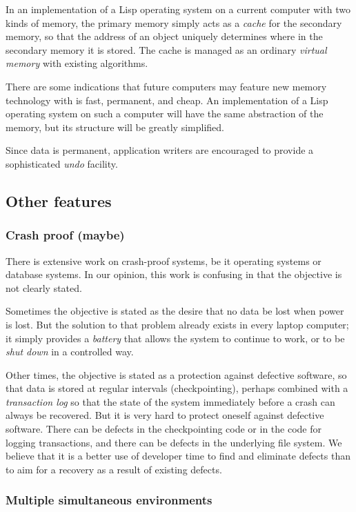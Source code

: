 In an implementation of a Lisp operating system on a current computer
with two kinds of memory, the primary memory simply acts as a
\emph{cache} for the secondary memory, so that the address of an
object uniquely determines where in the secondary memory it is stored.
The cache is managed as an ordinary \emph{virtual memory} with
existing algorithms.

There are some indications that future computers may feature new
memory technology with is fast, permanent, and cheap.  An
implementation of a Lisp operating system on such a computer will have
the same abstraction of the memory, but its structure will be greatly
simplified.

Since data is permanent, application writers are encouraged to
provide a sophisticated \emph{undo} facility.  

\subsection{Other features}

\subsubsection{Crash proof (maybe)}

There is extensive work on crash-proof systems, be it operating
systems or database systems.  In our opinion, this work is
confusing in that the objective is not clearly stated.

Sometimes the objective is stated as the desire that no data be lost
when power is lost.  But the solution to that problem already exists
in every laptop computer; it simply provides a \emph{battery} that
allows the system to continue to work, or to be \emph{shut down} in a
controlled way. 

Other times, the objective is stated as a protection against
defective software, so that data is stored at regular intervals
(checkpointing), perhaps combined with a \emph{transaction log} so
that the state of the system immediately before a crash can always
be recovered.  But it is very hard to protect oneself against
defective software.  There can be defects in the checkpointing code
or in the code for logging transactions, and there can be defects in
the underlying file system.  We believe that it is a better use of
developer time to find and eliminate defects than to aim for a
recovery as a result of existing defects.

\subsubsection{Multiple simultaneous environments}

